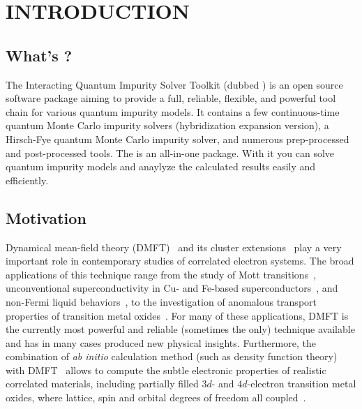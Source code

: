 \chapter{INTRODUCTION}
\section{What's {\iqist}?}

The Interacting Quantum Impurity Solver Toolkit (dubbed {\iqist}) is an open source software package aiming to provide a full, reliable, flexible, and powerful tool chain for various quantum impurity models. It contains a few continuous-time quantum Monte Carlo impurity solvers (hybridization expansion version), a Hirsch-Fye quantum Monte Carlo impurity solver, and numerous prep-processed and post-processed tools. The {\iqist} is an all-in-one package. With it you can solve quantum impurity models and anaylyze the calculated results easily and efficiently.

\section{Motivation}

Dynamical mean-field theory (DMFT)~\cite{RevModPhys.68.13} and its cluster extensions~\cite{RevModPhys.77.1027,RevModPhys.78.865} play a very important role in contemporary studies of correlated electron systems. The broad applications of this technique range from the study of Mott transitions~\cite{PhysRevB.54.8452,PhysRevLett.101.186403}, unconventional superconductivity in Cu- and Fe-based superconductors~\cite{PhysRevLett.96.047005,Yin2011,PhysRevLett.106.047004,Wang13,PhysRevLett.110.216405,PhysRevB.88.245110}, and non-Fermi liquid behaviors~\cite{PhysRevLett.102.206407,PhysRevLett.108.216401,PhysRevLett.110.086401}, to the investigation of anomalous transport properties of transition metal oxides~\cite{RevModPhys.70.1039}. For many of these applications, DMFT is the currently most powerful and reliable (sometimes the only) technique available and has in many cases produced new physical insights. Furthermore, the combination of \emph{ab initio} calculation method (such as density function theory) with DMFT~\cite{RevModPhys.78.865} allows to compute the subtle electronic properties of realistic correlated materials, including partially filled $3d$- and $4d$-electron transition metal oxides, where lattice, spin and orbital degrees of freedom all coupled~\cite{RevModPhys.70.1039}.

